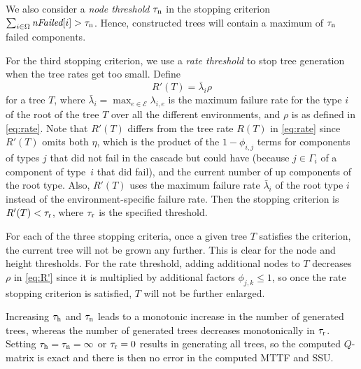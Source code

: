 \documentclass[12pt]{article}
\newcommand{\changed}[1]{#1}
\newcommand{\changed}[1]{\textcolor{red}{#1}}
\newcommand{\varName}[1]{\textrm{\it#1}}
\begin{document}
We also consider a \textit{node threshold}
\changed{$\tau_{\textrm n}$}
in the stopping criterion
$\sum_{i \in \Omega} \varName{nFailed}[i]
> \tau_{\textrm n}$.
Hence, constructed trees will
contain a maximum of $\tau_{\textrm n}$
failed components.

For the third stopping criterion,
we use a \textit{rate threshold}
\changed{to stop tree generation when
the tree rates get too small}.
Define
\begin{equation}
\label{eq:R'}
R'(T) = \bar{\lambda}_i \rho
\end{equation}
for a tree $T$,
where $\bar{\lambda}_i
= \max_{e \in \mathcal{E}} \lambda_{i,e}$
is the maximum failure rate for
the type $i$ of the root of the tree $T$
over all the different environments,
and $\rho$ is as defined in \eqref{eq:rate}.
Note that $R'(T)$ differs from
the tree rate $R(T)$
in \eqref{eq:rate} since
$R'(T)$ omits
\changed{both}
$\eta$,
which is the
product of the $1-\phi_{i,j}$
terms for components of types $j$
that did not fail in the cascade
but could have
(because
$j \in \Gamma_i$ of a component
of type~$i$ that did fail),
and the
current number of up components
of the root type.
\changed{Also, $R'(T)$ uses the maximum
failure rate $\bar{\lambda}_i$
of the root type $i$ instead of
the environment-specific failure rate.}
Then the stopping criterion is
$R'(T) < \changed{\tau_{\textrm r}}$,
where $\tau_{\textrm r}$ is the specified
threshold.

\changed{
For each of the three stopping criteria,
once a given tree $T$ satisfies the criterion,
the current tree will not be grown any further.
This is clear for the node and height thresholds.
For the rate threshold,
adding additional nodes to $T$
decreases $\rho$ in \eqref{eq:R'}
since it is multiplied by additional
factors $\phi_{j,k} \leq 1$,
so once the rate stopping
criterion is satisfied,
$T$ will not be further enlarged.}



Increasing $\tau_{\textrm h}$ and $\tau_{\textrm n}$
leads to a
monotonic increase in the number of
generated trees, whereas the number of generated trees decreases monotonically
in $\tau_{\textrm r}$. Setting
$\tau_{\textrm h} = \tau_{\textrm n} = \infty$
or $\tau_{\textrm r} = 0$ results in
generating all trees,
\changed{so the computed $Q$-matrix is exact and}
there is then no error in the
computed MTTF and SSU.
\end{document}
